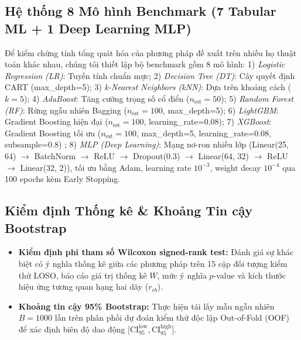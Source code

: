 \documentclass[conference]{IEEEtran}
\begin{document}
\subsection{Hệ thống 8 Mô hình Benchmark (7 Tabular ML + 1 Deep Learning MLP)}
Để kiểm chứng tính tổng quát hóa của phương pháp đề xuất trên nhiều họ thuật toán khác nhau, chúng tôi thiết lập bộ benchmark gồm 8 mô hình:
1) \textit{Logistic Regression (LR)}: Tuyến tính chuẩn mực;
2) \textit{Decision Tree (DT)}: Cây quyết định CART (max\_depth=5);
3) \textit{k-Nearest Neighbors (kNN)}: Dựa trên khoảng cách ($k=5$);
4) \textit{AdaBoost}: Tăng cường trọng số cổ điển ($n_{\text{est}}=50$);
5) \textit{Random Forest (RF)}: Rừng ngẫu nhiên Bagging ($n_{\text{est}}=100$, max\_depth=5);
6) \textit{LightGBM}: Gradient Boosting hiện đại ($n_{\text{est}}=100$, learning\_rate=0.08);
7) \textit{XGBoost}: Gradient Boosting tối ưu ($n_{\text{est}}=100$, max\_depth=5, learning\_rate=0.08, subsample=0.8) \cite{chen2016xgboost};
8) \textit{MLP (Deep Learning)}: Mạng nơ-ron nhiều lớp (Linear(25, 64) $\rightarrow$ BatchNorm $\rightarrow$ ReLU $\rightarrow$ Dropout(0.3) $\rightarrow$ Linear(64, 32) $\rightarrow$ ReLU $\rightarrow$ Linear(32, 2)), tối ưu bằng Adam, learning rate $10^{-3}$, weight decay $10^{-4}$ qua 100 epochs kèm Early Stopping.

\subsection{Kiểm định Thống kê \& Khoảng Tin cậy Bootstrap}
\begin{itemize}
    \item \textbf{Kiểm định phi tham số Wilcoxon signed-rank test:} Đánh giá sự khác biệt có ý nghĩa thống kê giữa các phương pháp trên 15 cặp đối tượng kiểm thử LOSO, báo cáo giá trị thống kê $W$, mức ý nghĩa $p$-value và kích thước hiệu ứng tương quan hạng hai dãy ($r_{rb}$).
    \item \textbf{Khoảng tin cậy 95\% Bootstrap:} Thực hiện tái lấy mẫu ngẫu nhiên $B = 1000$ lần trên phân phối dự đoán kiểm thử độc lập Out-of-Fold (OOF) để xác định biên độ dao động [$\text{CI}_{95}^{\text{low}}, \text{CI}_{95}^{\text{high}}$].
\end{itemize}
\end{document}
